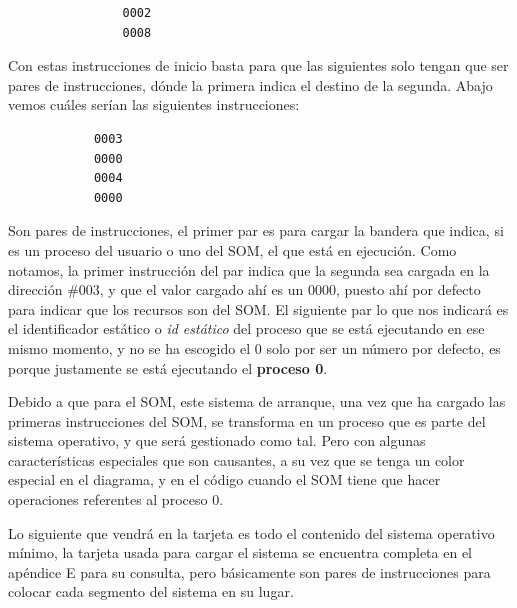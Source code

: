 \documentclass[letterpaper,12pt,oneside]{book}
\begin{document}
		\begin{center}
		\begin{minipage}{0\textwidth}
			\begin{verbatim}
				0002
				0008
			\end{verbatim}	
		\end{minipage}
		\end{center}
		
		Con estas instrucciones de inicio basta para que las siguientes solo tengan que ser pares de instrucciones, dónde la primera indica el destino de la segunda. Abajo vemos cuáles serían 
		las siguientes instrucciones:
		
		\begin{center}
		\begin{minipage}{0\textwidth}
			\begin{verbatim}
			0003
			0000
			0004
			0000
			\end{verbatim}	
		\end{minipage}
		\end{center}
		
		Son pares de instrucciones, el primer par es para cargar la bandera que indica, si es un proceso del usuario o uno del SOM, el que está en ejecución.
		Como notamos, la primer instrucción del par indica que la segunda sea cargada en la dirección \#003, y que el valor cargado ahí es un 0000, puesto
		ahí por defecto para indicar que los recursos son del SOM. El siguiente par lo que nos indicará es el identificador estático o \textit{id estático} del proceso
		que se está ejecutando en ese mismo momento, y no se ha escogido el 0 solo por ser un número por defecto, es porque justamente se está ejecutando el 
		\textbf{proceso 0}. 
  
        Debido a que para el SOM, este sistema de arranque, una vez que ha cargado las primeras instrucciones del SOM,
		se transforma en un proceso que es parte del sistema operativo, y que será gestionado como tal. Pero con algunas características especiales que son
		causantes, a su vez que se tenga un color especial en el diagrama, y en el código cuando el SOM tiene que hacer operaciones referentes al proceso 0.
		
		Lo siguiente que vendrá en la tarjeta es todo el contenido  del sistema operativo mínimo, la tarjeta usada para cargar el sistema
		se encuentra completa en el apéndice E para su consulta, pero básicamente son pares de instrucciones para colocar cada segmento
		del sistema en su lugar.
		
\end{document}
